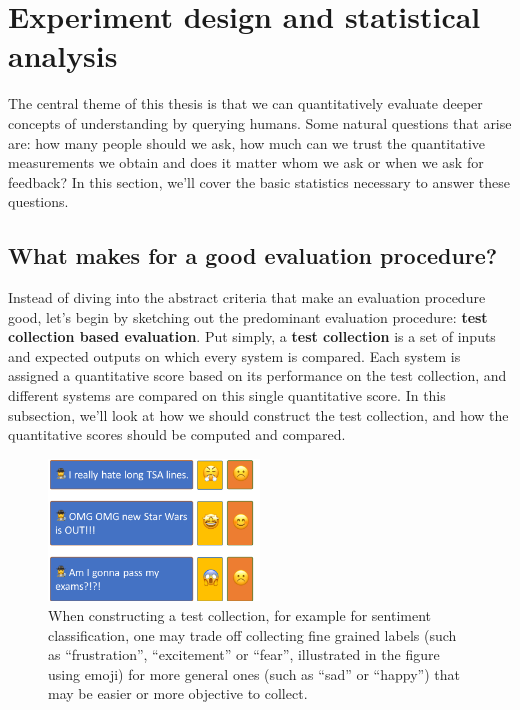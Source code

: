 \section{\label{sec:setup:statistics} Experiment design and statistical analysis}

The central theme of this thesis is that we can quantitatively evaluate deeper concepts of understanding by querying humans.
Some natural questions that arise are: how many people should we ask, how much can we trust the quantitative measurements we obtain and does it matter whom we ask or when we ask for feedback?
In this section, we'll cover the basic statistics necessary to answer these questions.

\subsection{What makes for a good evaluation procedure?}

Instead of diving into the abstract criteria that make an evaluation procedure good, let's begin by sketching out the predominant evaluation procedure: \textbf{test collection based evaluation}.
Put simply, a \textbf{test collection} is a set of inputs and expected outputs on which every system is compared.
Each system is assigned a quantitative score based on its performance on the test collection, and different systems are compared on this single quantitative score.
In this subsection, we'll look at how we should construct the test collection, and how the quantitative scores should be computed and compared.

\begin{figure}
  \centering
  \includegraphics[width=0.5\textwidth]{figures/sentiment-choices}
  \caption[Constructing test collections]{\label{setup:sentiment-choices} When constructing a test collection, for example for sentiment classification, one may trade off collecting fine grained labels (such as ``frustration'', ``excitement'' or ``fear'', illustrated in the figure using emoji) for more general ones (such as ``sad'' or ``happy'') that may be easier or more objective to collect.}
\end{figure}

